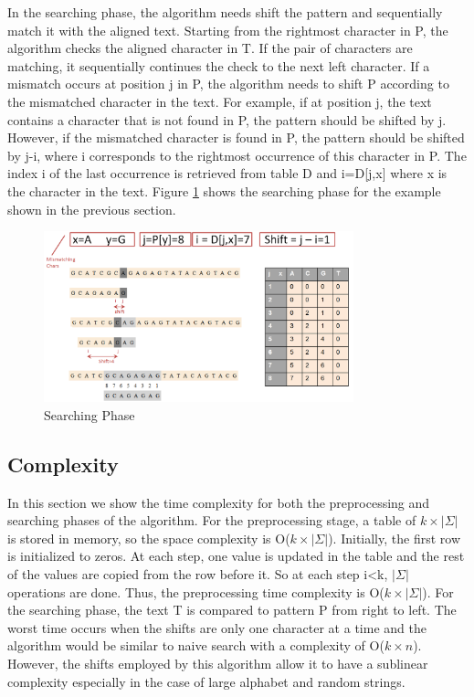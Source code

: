 \documentclass[paper=a4, fontsize=11pt]{scrartcl} %
\numberwithin{equation}{section} %
\numberwithin{figure}{section} %
\numberwithin{table}{section} %
\begin{document}
In the searching phase, the algorithm needs shift the pattern and sequentially match it with the aligned text. Starting from the rightmost character in P, the algorithm checks the aligned character in T. If the pair of characters are matching, it sequentially continues the check to the next left character. If a mismatch occurs at position j in P, the algorithm needs to shift P according to the mismatched character in the text. For example, if at position j, the text contains a character that is not found in P, the pattern should be shifted by j. However, if the mismatched character is found in P, the pattern should be shifted by j-i, where i corresponds to the rightmost occurrence of this character in P. The index i of the last occurrence is retrieved from table D and i=D[j,x] where x is the character in the text. Figure \ref{fig:search} shows the searching phase for the example shown in the previous section.

\begin{figure}[h!]
\centering
\includegraphics[width=0.8\textwidth]{figures/searching_phase.png}
\caption{Searching Phase}
\label{fig:search}
\end{figure}


\subsection{Complexity}
In this section we show the time complexity for both the preprocessing and searching phases of the algorithm. For the preprocessing stage, a table of $k\times|\Sigma|$ is stored in memory, so the space complexity is O($k\times|\Sigma|$). Initially, the first row is initialized to zeros. At each step, one value is updated in the table and the rest of the values are copied from the row before it. So at each step i<k, $|\Sigma|$ operations are done. Thus, the preprocessing time complexity is O($k\times|\Sigma|$). For the searching phase, the text T is compared to pattern P from right to left. The worst time occurs when the shifts are only one character at a time and the algorithm would be similar to naive search with a complexity of O($k\times n$). However, the shifts employed by this algorithm allow it to have a sublinear complexity especially in the case of large alphabet and random strings.
\end{document}
